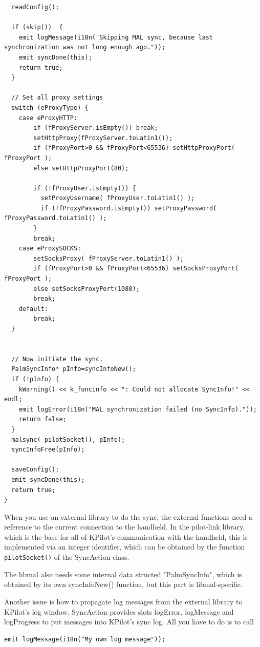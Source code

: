 \documentclass[10pt,a4paper]{article}
\begin{document}
{\begin{verbatim}
  readConfig();
  
  if (skip())  {
    emit logMessage(i18n("Skipping MAL sync, because last synchronization was not long enough ago."));
    emit syncDone(this);
    return true;
  }
  
  // Set all proxy settings
  switch (eProxyType) {
    case eProxyHTTP:
        if (fProxyServer.isEmpty()) break;
        setHttpProxy(fProxyServer.toLatin1());
        if (fProxyPort>0 && fProxyPort<65536) setHttpProxyPort( fProxyPort );
        else setHttpProxyPort(80);
      
        if (!fProxyUser.isEmpty()) {
          setProxyUsername( fProxyUser.toLatin1() );
          if (!fProxyPassword.isEmpty()) setProxyPassword( fProxyPassword.toLatin1() );
        }
        break;
    case eProxySOCKS:
        setSocksProxy( fProxyServer.toLatin1() );
        if (fProxyPort>0 && fProxyPort<65536) setSocksProxyPort( fProxyPort );
        else setSocksProxyPort(1080);
        break; 
    default:
        break;
  }


  // Now initiate the sync.
  PalmSyncInfo* pInfo=syncInfoNew();
  if (!pInfo) {
    kWarning() << k_funcinfo << ": Could not allocate SyncInfo!" << endl;
    emit logError(i18n("MAL synchronization failed (no SyncInfo)."));
    return false;
  }
  malsync( pilotSocket(), pInfo);
  syncInfoFree(pInfo);

  saveConfig();
  emit syncDone(this);
  return true;
}

\end{verbatim}
}

When you use an external library to do the sync, the external functions need a reference to the current connection to the handheld. In the pilot-link library, which is the base for all of KPilot's communication with the handheld, this is implemented via an integer identifier, which can be obtained by the function \texttt{pilotSocket()} of the SyncAction class.

The libmal also needs some internal data structed "PalmSyncInfo", which is obtained by its own syncInfoNew() function, but this part is libmal-specific.

Another issue is how to propagate log messages from the external library to KPilot's log window. SyncAction provides slots logError, logMessage and logProgress to put messages into KPilot's sync log. All you have to do is to call
\begin{verbatim}
emit logMessage(i18n("My own log message"));
\end{verbatim}
\end{document}
